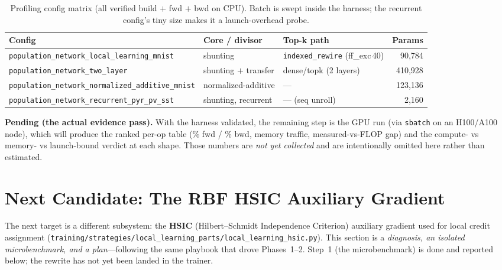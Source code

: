 \documentclass[11pt]{article}
\begin{document}
\begin{table}[h]
\centering
\small
\begin{tabular}{@{}lllr@{}}
\toprule
\textbf{Config} & \textbf{Core / divisor} & \textbf{Top-k path} & \textbf{Params} \\
\midrule
\texttt{population\_network\_local\_learning\_mnist} & shunting & \texttt{indexed\_rewire} (ff\_exc\,40) & 90{,}784 \\
\texttt{population\_network\_two\_layer} & shunting $+$ transfer & dense/topk (2 layers) & 410{,}928 \\
\texttt{population\_network\_normalized\_additive\_mnist} & normalized-additive & --- & 123{,}136 \\
\texttt{population\_network\_recurrent\_pyr\_pv\_sst} & shunting, recurrent & --- (seq unroll) & 2{,}160 \\
\bottomrule
\end{tabular}
\caption{Profiling config matrix (all verified build $+$ fwd $+$ bwd on CPU). Batch is swept
inside the harness; the recurrent config's tiny size makes it a launch-overhead probe.}
\label{tab:cfgmatrix}
\end{table}

\noindent\textbf{Pending (the actual evidence pass).} With the harness validated, the remaining
step is the GPU run (via \texttt{sbatch} on an H100/A100 node), which will produce the ranked
per-op table (\% fwd / \% bwd, memory traffic, measured-vs-FLOP gap) and the compute- vs
memory- vs launch-bound verdict at each shape. Those numbers are \emph{not yet collected} and
are intentionally omitted here rather than estimated.

\section{Next Candidate: The RBF HSIC Auxiliary Gradient}

The next target is a different subsystem: the \textbf{HSIC} (Hilbert--Schmidt Independence
Criterion) auxiliary gradient used for local credit assignment
(\texttt{training/strategies/local\_learning\_parts/local\_learning\_hsic.py}). This section is a
\emph{diagnosis, an isolated microbenchmark, and a plan}---following the same playbook that drove
Phases~1--2. Step~1 (the microbenchmark) is done and reported below; the rewrite has not yet been
landed in the trainer.
\end{document}
